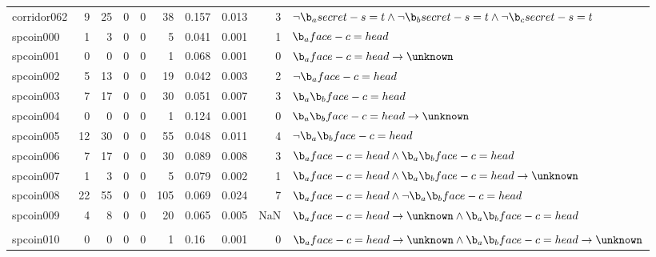 \begin{tabular}{lrrrrrllrl}
corridor062 & 9 & 25 & 0 & 0 & 38 & 0.157 & 0.013 & 3 & $\neg \b_a secret-s=t \land \neg \b_b secret-s=t \land \neg \b_c secret-s=t $ \\%
spcoin000 & 1 & 3 & 0 & 0 & 5 & 0.041 & 0.001 & 1 & $\b_a face-c=head $ \\%
spcoin001 & 0 & 0 & 0 & 0 & 1 & 0.068 & 0.001 & 0 & $\b_a face-c=head  \rightarrow \unknown $ \\%
spcoin002 & 5 & 13 & 0 & 0 & 19 & 0.042 & 0.003 & 2 & $\neg \b_a face-c=head $ \\%
spcoin003 & 7 & 17 & 0 & 0 & 30 & 0.051 & 0.007 & 3 & $\b_a \b_b face-c=head $ \\%
spcoin004 & 0 & 0 & 0 & 0 & 1 & 0.124 & 0.001 & 0 & $\b_a \b_b face-c=head  \rightarrow \unknown $ \\%
spcoin005 & 12 & 30 & 0 & 0 & 55 & 0.048 & 0.011 & 4 & $\neg \b_a \b_b face-c=head $ \\%
spcoin006 & 7 & 17 & 0 & 0 & 30 & 0.089 & 0.008 & 3 & $\b_a face-c=head \land \b_a \b_b face-c=head $ \\%
spcoin007 & 1 & 3 & 0 & 0 & 5 & 0.079 & 0.002 & 1 & $\b_a face-c=head \land \b_a \b_b face-c=head  \rightarrow \unknown $ \\%
spcoin008 & 22 & 55 & 0 & 0 & 105 & 0.069 & 0.024 & 7 & $\b_a face-c=head \land \neg \b_a \b_b face-c=head $ \\%
spcoin009 & 4 & 8 & 0 & 0 & 20 & 0.065 & 0.005 & NaN & $\b_a face-c=head  \rightarrow \unknown \land \b_a \b_b face-c=head $ \\ \\
spcoin010 & 0 & 0 & 0 & 0 & 1 & 0.16 & 0.001 & 0 & $\b_a face-c=head  \rightarrow \unknown \land \b_a \b_b face-c=head  \rightarrow \unknown $ \\%

\end{tabular}
